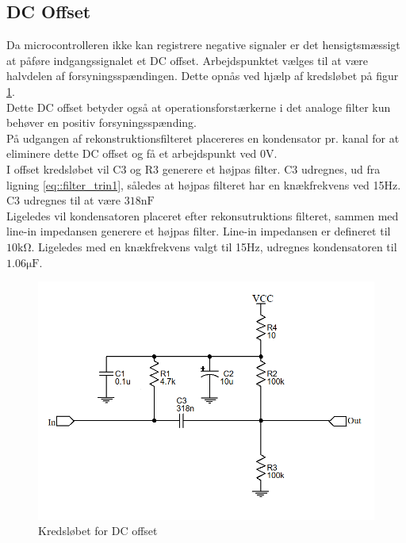 \subsection{DC Offset}
Da microcontrolleren ikke kan registrere negative signaler er det hensigtsmæssigt at påføre indgangssignalet et DC offset. Arbejdspunktet vælges til at være halvdelen af forsyningsspændingen. Dette opnås ved hjælp af kredsløbet på figur \ref{fig::anfilter_off}. \\
Dette DC offset betyder også at operationsforstærkerne i det analoge filter kun behøver en positiv forsyningsspænding. \\
På udgangen af rekonstruktionsfilteret placereres en kondensator pr. kanal for at eliminere dette DC offset og få et arbejdspunkt ved 0V.\\
I offset kredsløbet vil C3 og R3 generere et højpas filter. C3 udregnes, ud fra ligning \ref{eq::filter_trin1}, således at højpas filteret har en knækfrekvens ved 15Hz. C3 udregnes til at være $318\si{\nano\farad}$\\
Ligeledes vil kondensatoren placeret efter rekonsutruktions filteret, sammen med line-in impedansen generere et højpas filter. Line-in impedansen er defineret til $10\si{\kilo\ohm}$. Ligeledes med en knækfrekvens valgt til 15Hz, udregnes kondensatoren til $1.06\si{\micro\farad}$.

\begin{figure}[h!]
	\centering
	\includegraphics[scale = 0.35]{./billeder/offset.png}
	\caption{Kredsløbet for DC offset}
	\label{fig::anfilter_off}
\end{figure}







